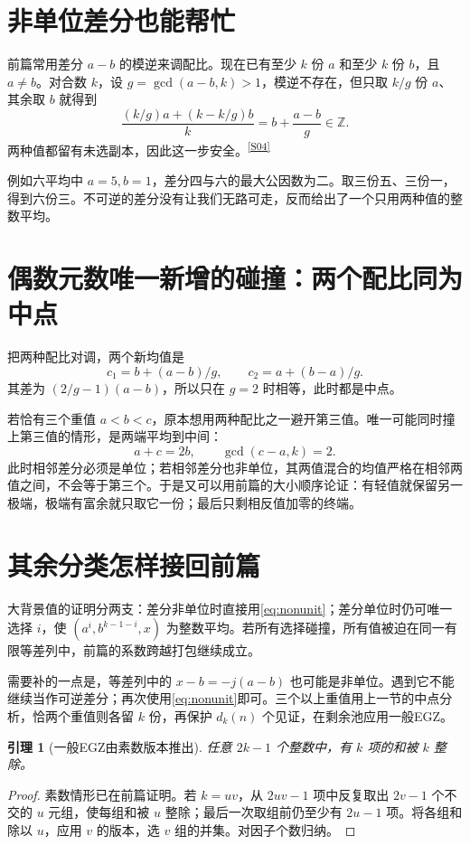\documentclass[11pt,a4paper,oneside,openany]{book}
\newcommand{\Z}{\mathbb Z}\newcommand{\Q}{\mathbb Q}\newcommand{\F}{\mathbb F}\newcommand{\CC}{\mathbb C}
\newcommand{\src}[1]{\textsuperscript{\hyperref[source:#1]{[#1]}}}
\newtheorem{lemma}[theorem]{引理}\newtheorem{proposition}[theorem]{命题}
\theoremstyle{definition}\newtheorem{example}[theorem]{例}\newtheorem{conjecture}[theorem]{猜想}
\numberwithin{equation}{chapter}\setcounter{tocdepth}{1}
\begin{document}
\section{非单位差分也能帮忙}
前篇常用差分 $a-b$ 的模逆来调配比。现在已有至少 $k$ 份 $a$ 和至少 $k$ 份 $b$，且 $a\ne b$。对合数 $k$，设 $g=\gcd(a-b,k)>1$，模逆不存在，但只取 $k/g$ 份 $a$、其余取 $b$ 就得到
\begin{equation}\label{eq:nonunit}
\frac{(k/g)a+(k-k/g)b}{k}=b+\frac{a-b}{g}\in\Z.
\end{equation}
两种值都留有未选副本，因此这一步安全。\src{S04}

例如六平均中 $a=5,b=1$，差分四与六的最大公因数为二。取三份五、三份一，得到六份三。不可逆的差分没有让我们无路可走，反而给出了一个只用两种值的整数平均。

\section{偶数元数唯一新增的碰撞：两个配比同为中点}
把两种配比对调，两个新均值是
\[c_1=b+(a-b)/g,\qquad c_2=a+(b-a)/g.
\]
其差为 $(2/g-1)(a-b)$，所以只在 $g=2$ 时相等，此时都是中点。

若恰有三个重值 $a<b<c$，原本想用两种配比之一避开第三值。唯一可能同时撞上第三值的情形，是两端平均到中间：
\[a+c=2b,\qquad\gcd(c-a,k)=2.
\]
此时相邻差分必须是单位；若相邻差分也非单位，其两值混合的均值严格在相邻两值之间，不会等于第三个。于是又可以用前篇的大小顺序论证：有轻值就保留另一极端，极端有富余就只取它一份；最后只剩相反值加零的终端。

\section{其余分类怎样接回前篇}
大背景值的证明分两支：差分非单位时直接用\eqref{eq:nonunit}；差分单位时仍可唯一选择 $i$，使 $(a^i,b^{k-1-i},x)$ 为整数平均。若所有选择碰撞，所有值被迫在同一有限等差列中，前篇的系数跨越打包继续成立。

需要补的一点是，等差列中的 $x-b=-j(a-b)$ 也可能是非单位。遇到它不能继续当作可逆差分；再次使用\eqref{eq:nonunit}即可。三个以上重值用上一节的中点分析，恰两个重值则各留 $k$ 份，再保护 $d_k(n)$ 个见证，在剩余池应用一般EGZ。

\begin{lemma}[一般EGZ由素数版本推出]
任意 $2k-1$ 个整数中，有 $k$ 项的和被 $k$ 整除。
\end{lemma}
\begin{proof}
素数情形已在前篇证明。若 $k=uv$，从 $2uv-1$ 项中反复取出 $2v-1$ 个不交的 $u$ 元组，使每组和被 $u$ 整除；最后一次取组前仍至少有 $2u-1$ 项。将各组和除以 $u$，应用 $v$ 的版本，选 $v$ 组的并集。对因子个数归纳。
\end{proof}
\end{document}
